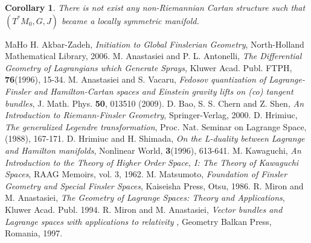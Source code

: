 \documentclass[10pt,a4paper]{article}
\theoremstyle{plain}
\newtheorem{cor}[theorem]{Corollary}
\theoremstyle{definition}
\begin{document}
\begin{cor}
There is not exist any non-Riemannian Cartan structure such that
$(T^{\ast}M_0, G, J)$ became a locally symmetric manifold.
\end{cor}
\begin{thebibliography}{MaHo}
H. Akbar-Zadeh, {\it  Initiation to Global Finslerian Geometry}, North-Holland Mathematical Library, 2006.
 M. Anastasiei and P. L. Antonelli, {\it The Differential Geometry of Lagrangians
which Generate Sprays}, Kluwer Acad. Publ. FTPH, {\bf 76}(1996), 15-34.
 M. Anastasiei and S. Vacaru, {\it   Fedosov quantization of Lagrange-Finsler
and Hamilton-Cartan spaces and Einstein gravity lifts on (co) tangent bundles}, J. Math. Phys. {\bf 50}, 013510 (2009).
 D. Bao, S. S. Chern and Z. Shen, {\it An Introduction to Riemann-Finsler
Geometry},  Springer-Verlag, 2000.
 D. Hrimiuc, {\it The generalized Legendre transformation}, Proc. Nat. Seminar
on Lagrange Space, (1988), 167-171.
   D. Hrimiuc and H. Shimada, {\it On the L-duality between Lagrange and Hamilton
manifolds}, Nonlinear World, {\bf 3}(1996), 613-641.
 M. Kawaguchi, {\it An Introduction to the Theory of Higher Order Space, I: The
Theory of Kawaguchi Spaces}, RAAG Memoirs, vol. 3, 1962.
 M. Matsumoto, {\it Foundation of Finsler Geometry and Special Finsler
Spaces}, Kaiseisha Press, Otsu, 1986.
 R. Miron and M. Anastasiei, {\it The Geometry of Lagrange Spaces: Theory and Applications}, Kluwer Acad. Publ. 1994.
 R. Miron and M. Anastasiei, {\it Vector bundles and Lagrange spaces with applications to relativity }, Geometry Balkan Press, Romania, 1997.

\end{thebibliography}
\end{document}
